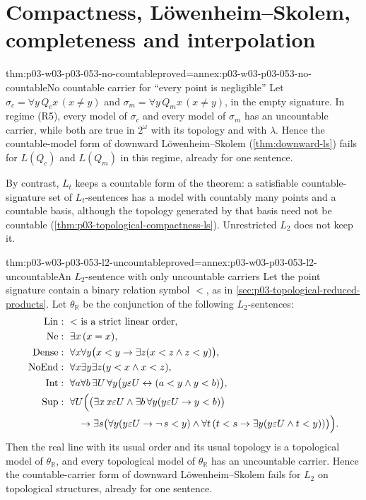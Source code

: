 \section{Compactness, L\"owenheim--Skolem, completeness and interpolation}
\label{sec:p03-w03-p03-053-transfer}

\begin{hbtheorem}{thm:p03-w03-p03-053-no-countable}{proved=annex:p03-w03-p03-053-no-countable}{No countable carrier for ``every point is negligible''}
Let
\(\sigma_c=\forall y\,Q_cx\,(x\neq y)\) and
\(\sigma_m=\forall y\,Q_mx\,(x\neq y)\), in the empty signature.
In regime (R5), every model of \(\sigma_c\) and every model of
\(\sigma_m\) has an uncountable carrier, while both are true in
\(2^\omega\) with its topology and with \(\lambda\). Hence the
countable-model form of downward L\"owenheim--Skolem
(\cref{thm:downward-ls}) fails for \(L(Q_c)\) and \(L(Q_m)\) in
this regime, already for one sentence.
\end{hbtheorem}

By contrast, \(L_t\) keeps a countable form of the theorem: a satisfiable
countable-signature set of \(L_t\)-sentences has a model with countably
many points and a countable basis, although the topology generated by
that basis need not be countable
(\cref{thm:p03-topological-compactness-ls}).
Unrestricted \(L_2\) does not keep it.

\begin{hbtheorem}{thm:p03-w03-p03-053-l2-uncountable}{proved=annex:p03-w03-p03-053-l2-uncountable}{An \(L_2\)-sentence with only uncountable carriers}
Let the point signature contain a binary relation symbol \(<\), as in
\cref{sec:p03-topological-reduced-products}. Let \(\theta_{\mathbb R}\) be
the conjunction of the following \(L_2\)-sentences:
\[
\begin{aligned}
 \mathrm{Lin}&:\ \text{\(<\) is a strict linear order},\\
 \mathrm{Ne}&:\ \exists x\,(x=x),\\
 \mathrm{Dense}&:\ \forall x\forall y\bigl(x<y\to\exists z(x<z\land z<y)\bigr),\\
 \mathrm{NoEnd}&:\ \forall x\exists y\exists z(y<x\land x<z),\\
 \mathrm{Int}&:\ \forall a\forall b\,\exists U\,\forall y
     \bigl(y\varepsilon U\leftrightarrow(a<y\land y<b)\bigr),\\
 \mathrm{Sup}&:\ \forall U\Bigl(\bigl(\exists x\,x\varepsilon U\land
     \exists b\,\forall y(y\varepsilon U\to y<b)\bigr)\\
   &\qquad\to\exists s\bigl(\forall y(y\varepsilon U\to\neg\,s<y)\land
     \forall t\,(t<s\to\exists y(y\varepsilon U\land t<y))\bigr)\Bigr).
\end{aligned}
\]
Then the real line with its usual order and its usual topology is a
topological model of \(\theta_{\mathbb R}\), and every topological model
of \(\theta_{\mathbb R}\) has an uncountable carrier. Hence the
countable-carrier form of downward L\"owenheim--Skolem fails for
\(L_2\) on topological structures, already for one sentence.
\end{hbtheorem}

